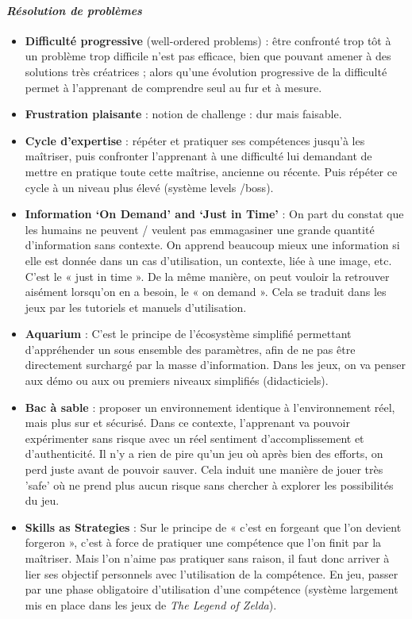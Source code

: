 			\paragraph{\emph{Résolution de problèmes}}
			\begin{itemize}
				\item {\textbf{Difficulté progressive} (well-ordered problems)} : être confronté trop tôt à un problème
trop difficile n'est pas efficace, bien que pouvant amener à des solutions très créatrices ;
alors qu'une évolution progressive de la difficulté permet à l'apprenant de comprendre seul au fur et à mesure.
				\item {\textbf{Frustration plaisante}} : notion de challenge : dur mais faisable.
				\item {\textbf{Cycle d'expertise}} : répéter et pratiquer ses compétences jusqu'à les maîtriser, puis confronter l'apprenant à une difficulté lui demandant de mettre en pratique toute cette maîtrise, ancienne ou récente. Puis répéter ce cycle à un niveau plus élevé (système levels /boss).
				\item {\textbf{Information ‘On Demand’ and ‘Just in Time’}} :
On part du constat que les humains ne peuvent / veulent pas emmagasiner une grande quantité d'information sans contexte. On apprend beaucoup mieux une information si elle est donnée dans un cas d'utilisation, un contexte, liée à une image, etc. C'est le « just in time ». De la même manière, on peut vouloir la retrouver aisément lorsqu'on en a besoin, le « on demand ». Cela se traduit dans les jeux par les tutoriels et manuels d'utilisation.
				\item {\textbf{Aquarium}} : C'est le principe de l'écosystème simplifié permettant d'appréhender un sous ensemble des paramètres, afin de ne pas être directement surchargé par la masse d'information. Dans les jeux, on va penser aux démo ou aux ou premiers niveaux simplifiés (didacticiels). 
				\item {\textbf{Bac à sable}} : proposer un environnement identique à l'environnement réel, mais plus sur et sécurisé. Dans ce contexte, l'apprenant va pouvoir expérimenter sans risque avec un réel sentiment d'accomplissement et d'authenticité. Il n'y a rien de pire qu'un jeu où après bien des efforts, on perd juste avant de pouvoir sauver. Cela induit une manière de jouer très 'safe' où ne prend plus aucun risque sans chercher à explorer les possibilités du jeu.
				\item {\textbf{Skills as Strategies}} : Sur le principe de « c'est en forgeant que l'on devient forgeron », c'est à force de pratiquer une compétence que l'on finit par la maîtriser. Mais l'on n'aime pas pratiquer sans raison, il faut donc arriver à lier ses objectif personnels avec l'utilisation de la compétence. En jeu, passer par une phase obligatoire d'utilisation d'une compétence (système largement mis en place dans les jeux de \emph{The Legend of Zelda}).
		\end{itemize}
